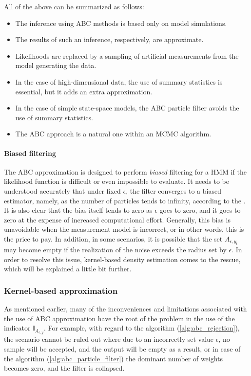 All of the above can be summarized as follows:
\begin{itemize}
    \item The inference using ABC methods is based only on model simulations.
    \item The results of such an inference, respectively, are approximate.
    \item Likelihoods are replaced by a sampling of artificial measurements from the model generating the data.
    \item In the case of high-dimensional data, the use of summary statistics is essential, but it adds an extra approximation.
    \item In the case of simple state-space models, the ABC particle filter avoids the use of summary statistics.
    \item The ABC approach is a natural one within an MCMC algorithm.
\end{itemize}

\paragraph*{Biased filtering} The ABC approximation is designed to perform \emph{biased} filtering for a HMM if the likelihood function is difficult or even impossible to evaluate. It needs to be understood accurately that under fixed \(\epsilon\), the filter converges to a biased estimator, namely, as the number of particles tends to infinity, according to the \cite{jasra_filtering_2012}. It is also clear that the bias itself tends to zero as \(\epsilon\) goes to zero, and it goes to zero at the expense of increased computational effort. Generally, this bias is unavoidable when the measurement model is incorrect, or in other words, this is the price to pay. In addition, in some scenarios, it is possible that the set \(A_{\epsilon, y_t}\) may become empty if the realization of the noise exceeds the radius set by \(\epsilon\). In order to resolve this issue, kernel-based density estimation comes to the rescue, which will be explained a little bit further.

\subsubsection{Kernel-based approximation}
As mentioned earlier, many of the inconveniences and limitations associated with the use of ABC approximation have the root of the problem in the use of the indicator \(\mathbb{I}_{A_{\epsilon, y}}\). For example, with regard to the algorithm (\ref{alg:abc_rejection}), the scenario cannot be ruled out where due to an incorrectly set value \(\epsilon\), no sample will be accepted, and the output will be empty as a result, or in case of the algorithm (\ref{alg:abc_particle_filter}) the dominant number of weights becomes zero, and the filter is collapsed.

